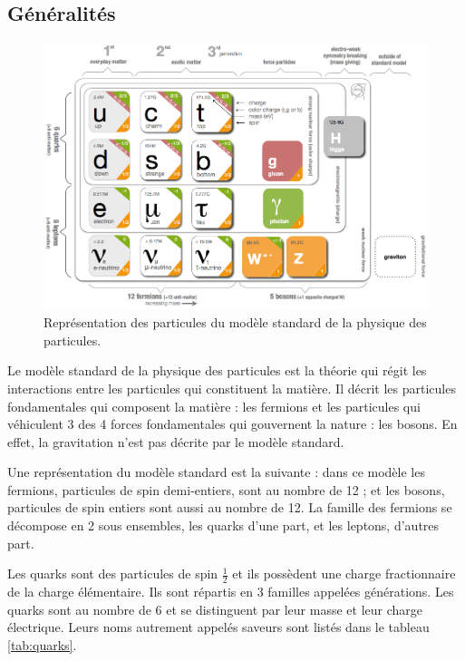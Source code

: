 \subsection{G\'en\'eralit\'es}

\begin{figure}[htb!]
 \begin{center}
   \includegraphics[scale=0.40]{./figures/Standard_model_infographic.png}
   \caption{Représentation des particules du mod\`ele standard de la physique des particules.}
  \end{center}
\end{figure}

Le mod\`ele standard de la physique des particules est la th\'eorie qui r\'egit 
les interactions entre les particules qui constituent la mati\`ere. 
Il d\'ecrit les particules fondamentales qui composent la mati\`ere : les 
fermions et les particules qui v\'ehiculent 3 des 4 forces fondamentales qui 
gouvernent la nature : les bosons. En effet, la gravitation n'est pas d\'ecrite 
par le mod\`ele standard.

\medskip

Une repr\'esentation du mod\`ele standard est la suivante : dans ce mod\`ele les fermions, particules de spin demi-entiers, sont au nombre de 12 ; et les bosons, particules de spin entiers sont aussi au nombre de 12.
La famille des fermions se d\'ecompose en 2 sous ensembles, les quarks d'une 
part, et les leptons, d'autres part. 

\medskip

Les quarks sont des particules de spin $\frac{1}{2}$ et ils poss\`edent une 
charge fractionnaire de la charge \'el\'ementaire. Ils sont r\'epartis en 3 familles 
appel\'ees g\'en\'erations. Les quarks sont au nombre de 6 et se distinguent par leur 
masse et leur charge \'electrique. Leurs noms autrement appel\'es saveurs sont list\'es dans le 
tableau \ref{tab:quarks}.


